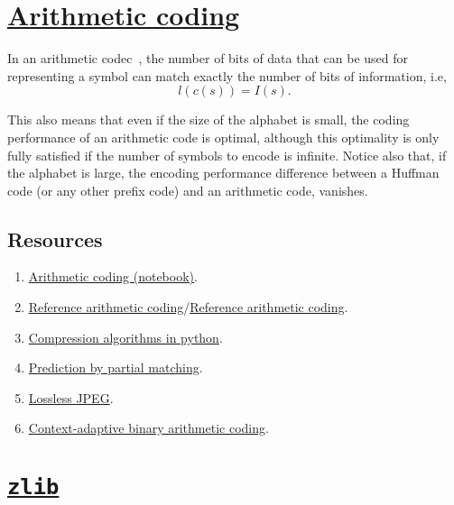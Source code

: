 \section{\href{https://en.wikipedia.org/wiki/Arithmetic_coding}{Arithmetic
    coding}}

In an arithmetic codec~\cite{vruiz__arithmetic_coding,ruiz2000compresion}, the number of
bits of data that can be used for representing a symbol can match
exactly the number of bits of information, i.e,
\begin{equation}
  l(c(s)) = I(s).
\end{equation}

This also means that even if the size of the alphabet is small, the
coding performance of an arithmetic code is optimal, although this
optimality is only fully satisfied if the number of symbols to encode
is infinite. Notice also that, if the alphabet is large, the encoding
performance difference between a Huffman code (or any other prefix
code) and an arithmetic code, vanishes.

\subsection*{Resources}
\begin{enumerate}
\item \href{https://github.com/vicente-gonzalez-ruiz/arithmetic_coding}{Arithmetic coding (notebook)}.
\item \href{https://www.nayuki.io/page/reference-arithmetic-coding}{Reference arithmetic coding}/\href{https://github.com/nayuki/Reference-arithmetic-coding}{Reference arithmetic coding}.
\item \href{https://www.inference.org.uk/mackay/python/compress/#AC}{Compression algorithms in python}.
\item \href{https://en.wikipedia.org/wiki/Prediction_by_partial_matching}{Prediction by partial matching}.
\item \href{https://en.wikipedia.org/wiki/Lossless_JPEG}{Lossless JPEG}.
\item \href{https://en.wikipedia.org/wiki/Context-adaptive_binary_arithmetic_coding}{Context-adaptive binary arithmetic coding}.
\end{enumerate}

\section{\href{https://zlib.net/}{\texttt{zlib}}}

